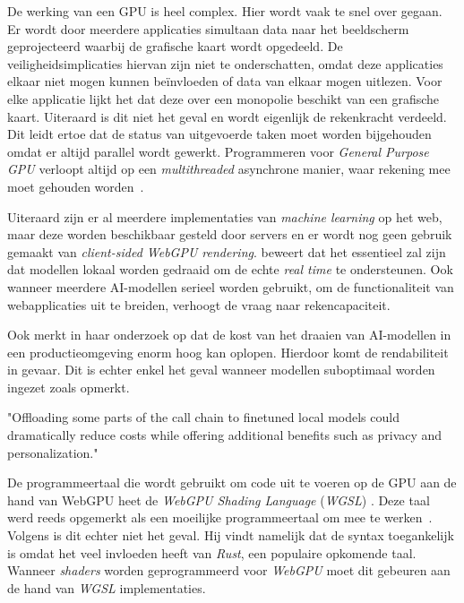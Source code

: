 \bigbreak{}

De werking van een GPU is heel complex. Hier wordt vaak te snel over gegaan. Er wordt door meerdere applicaties simultaan data naar het beeldscherm geprojecteerd waarbij de grafische kaart wordt opgedeeld. De veiligheidsimplicaties hiervan zijn niet te onderschatten, omdat deze applicaties elkaar niet mogen kunnen beïnvloeden of data van elkaar mogen uitlezen. Voor elke applicatie lijkt het dat deze over een monopolie beschikt van een grafische kaart. Uiteraard is dit niet het geval en wordt eigenlijk de rekenkracht verdeeld. Dit leidt ertoe dat de status van uitgevoerde taken moet worden bijgehouden omdat er altijd parallel wordt gewerkt. Programmeren voor \textit{General Purpose GPU} verloopt altijd op een \textit{multithreaded} asynchrone manier, waar rekening mee moet gehouden worden~\autocite{Surma2022}.

\bigbreak{}

Uiteraard zijn er al meerdere implementaties van \textit{machine learning} op het web, maar deze worden beschikbaar gesteld door servers en er wordt nog geen gebruik gemaakt van \textit{client-sided WebGPU rendering}. \textcite{Fleetwood2023a} beweert dat het essentieel zal zijn dat modellen lokaal worden gedraaid om de echte \textit{real time} te ondersteunen. Ook wanneer meerdere AI-modellen serieel worden gebruikt, om de functionaliteit van webapplicaties uit te breiden, verhoogt de vraag naar rekencapaciteit.

\bigbreak{}

Ook \textcite{Huyen2023} merkt in haar onderzoek op dat de kost van het draaien van AI-modellen in een productieomgeving enorm hoog kan oplopen. Hierdoor komt de rendabiliteit in gevaar. Dit is echter enkel het geval wanneer modellen suboptimaal worden ingezet zoals \textcite{Fleetwood2023a} opmerkt.

\begin{displayquote}
    "Offloading some parts of the call chain to finetuned local models could dramatically reduce costs while offering additional benefits such as privacy and personalization."
\end{displayquote}

\bigbreak{}

De programmeertaal die wordt gebruikt om code uit te voeren op de GPU aan de hand van WebGPU heet de \textit{WebGPU Shading Language} (\textit{WGSL}) \autocite{W3C2024}. Deze taal werd reeds opgemerkt als een moeilijke programmeertaal om mee te werken~\autocite{Madrigal2023, Ashton2020}. Volgens \textcite{Fleetwood2023a} is dit echter niet het geval. Hij vindt namelijk dat de syntax toegankelijk is omdat het veel invloeden heeft van \textit{Rust}, een populaire opkomende taal. Wanneer \textit{shaders} worden geprogrammeerd voor \textit{WebGPU} moet dit gebeuren aan de hand van \textit{WGSL} implementaties.

